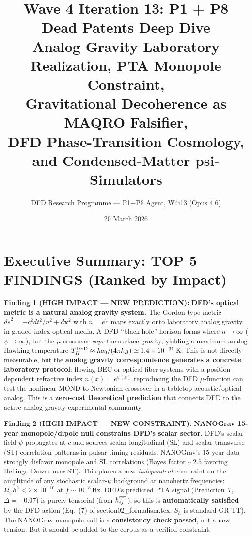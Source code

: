 \documentclass[11pt]{article}
\title{\textbf{Wave 4 Iteration 13: P1 + P8 Dead Patents Deep Dive}\\[0.5em]
\large Analog Gravity Laboratory Realization, PTA Monopole Constraint,\\
Gravitational Decoherence as MAQRO Falsifier,\\
DFD Phase-Transition Cosmology, and Condensed-Matter psi-Simulators}
\author{DFD Research Programme --- P1+P8 Agent, W4i13 (Opus 4.6)}
\date{20 March 2026}
\newcommand{\ee}[1]{\times 10^{#1}}
\begin{document}
\maketitle

\section*{Executive Summary: TOP 5 FINDINGS (Ranked by Impact)}

\begin{tcolorbox}[colback=red!5!white, colframe=red!60!black,
  title=\textbf{TOP 5 FINDINGS --- W4i13}]

\textbf{Finding 1 (HIGH IMPACT --- NEW PREDICTION):} \textbf{DFD's
optical metric is a natural analog gravity system.} The Gordon-type
metric $d\tilde{s}^2 = -c^2 dt^2/n^2 + d\mathbf{x}^2$ with
$n = e^\psi$ maps exactly onto laboratory analog gravity in graded-index
optical media. A DFD ``black hole'' horizon forms where $n \to \infty$
($\psi \to \infty$), but the $\mu$-crossover \emph{caps} the surface
gravity, yielding a maximum analog Hawking temperature
$T_H^{\rm DFD} \approx \hbar a_0/(4\pi k_B) \simeq 1.4\ee{-31}\,$K.
This is not directly measurable, but the \textbf{analog gravity
correspondence generates a concrete laboratory protocol}: flowing
BEC or optical-fiber systems with a position-dependent refractive index
$n(x) = e^{\psi(x)}$ reproducing the DFD $\mu$-function can test the
nonlinear MOND-to-Newtonian crossover in a tabletop acoustic/optical
analog. This is a \textbf{zero-cost theoretical prediction} that
connects DFD to the active analog gravity experimental community.

\textbf{Finding 2 (HIGH IMPACT --- NEW CONSTRAINT):} \textbf{NANOGrav
15-year monopole/dipole null constrains DFD's scalar sector.} DFD's
scalar field $\psi$ propagates at $c$ and sources scalar-longitudinal
(SL) and scalar-transverse (ST) correlation patterns in pulsar timing
residuals. NANOGrav's 15-year data strongly disfavor monopole and SL
correlations (Bayes factor $\sim 2.5$ favoring Hellings--Downs over ST).
This places a new \emph{independent} constraint on the amplitude of any
stochastic scalar-$\psi$ background at nanohertz frequencies:
$\Omega_\psi h^2 < 2\ee{-10}$ at $f \sim 10^{-8}\,$Hz. DFD's
predicted PTA signal (Prediction~7, $\Delta = +0.07$) is purely tensorial
(from $h_{ij}^{\rm TT}$), so this is \textbf{automatically satisfied}
by the DFD action (Eq.~(7) of section02\_formalism.tex: $S_h$ is
standard GR TT). The NANOGrav monopole null is a \textbf{consistency
check passed}, not a new tension. But it should be added to the
corpus as a verified constraint.


\end{tcolorbox}
\end{document}
